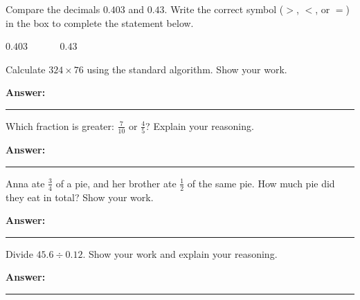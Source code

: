 \documentclass[12pt]{article}
\begin{document}
\begin{tcolorbox}[colframe=black!50, colback=white, title=\textbf{Problem 3 (5.NBT.A.3)}]
Compare the decimals \(0.403\) and \(0.43\). Write the correct symbol (\(>\), \(<\), or \(=\)) in the box to complete the statement below.

\begin{center}
    \Large
    \(0.403 \quad \boxed{\phantom{>}} \quad 0.43\)
\end{center}


\end{tcolorbox}



\begin{tcolorbox}[colframe=black!50, colback=white, title=\textbf{Problem 4 (5.NBT.A.5)}]
Calculate \(324 \times 76\) using the standard algorithm. Show your work.

\vspace{3.5cm}
\textbf{Answer:} \rule{0.5\textwidth}{0.4mm}
\end{tcolorbox}


\begin{tcolorbox}[colframe=black!50, colback=white, title=\textbf{Problem 5 (5.NBT.A.3)}]
Which fraction is greater: \( \frac{7}{10} \) or \( \frac{4}{5} \)? Explain your reasoning.

\vspace{3cm}
\textbf{Answer:} \rule{0.5\textwidth}{0.4mm}
\end{tcolorbox}

\begin{tcolorbox}[colframe=black!50, colback=white, title=\textbf{Problem 6 (5.NF.A.2)}]
Anna ate \( \frac{3}{4} \) of a pie, and her brother ate \( \frac{1}{2} \) of the same pie. How much pie did they eat in total? Show your work.

\vspace{3cm}
\textbf{Answer:} \rule{0.5\textwidth}{0.4mm}
\end{tcolorbox}

\begin{tcolorbox}[colframe=black!50, colback=white, title=\textbf{Problem 7 (5.NBT.B.7)}]
Divide \(45.6 \div 0.12\). Show your work and explain your reasoning.

\vspace{3cm}
\textbf{Answer:} \rule{0.5\textwidth}{0.4mm}
\end{tcolorbox}
\end{document}
